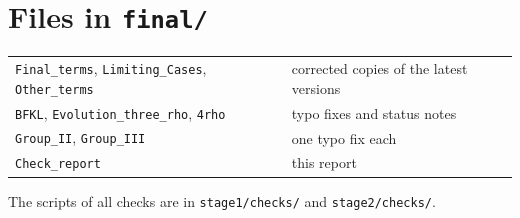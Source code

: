 \documentclass[10pt]{article}
\begin{document}
\section{Files in \texttt{final/}}
\begin{tabular}{ll}
\texttt{Final\_terms}, \texttt{Limiting\_Cases}, \texttt{Other\_terms} & corrected copies of the latest versions\\
\texttt{BFKL}, \texttt{Evolution\_three\_rho}, \texttt{4rho} & typo fixes and status notes\\
\texttt{Group\_II}, \texttt{Group\_III} & one typo fix each\\
\texttt{Check\_report} & this report\\
\end{tabular}

\noindent The scripts of all checks are in \texttt{stage1/checks/} and \texttt{stage2/checks/}.
\end{document}

